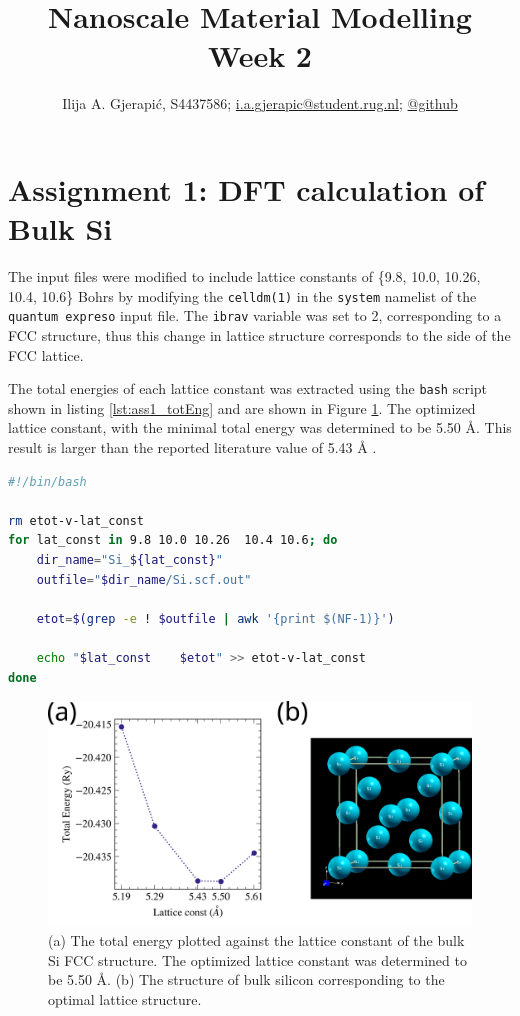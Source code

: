 \documentclass[10pt,a4paper]{labreport}
\title{Nanoscale Material Modelling
\\
\normalsize{Week 2}} %
\author{Ilija A. Gjerapić, S4437586; \href{mailto:i.a.gjerapic@student.rug.nl}{i.a.gjerapic@student.rug.nl}; \href{https://github.com/igjerapic/nmm-week2/}{@github} } %
\begin{document}
\maketitle

\tableofcontents


  

\thispagestyle{firststyle}
\newpage
\section{Assignment 1: DFT calculation of Bulk Si}
The input files were modified to include lattice constants of \{9.8, 10.0, 10.26, 10.4, 10.6\} Bohrs by modifying the  \texttt{celldm(1)} in the \texttt{system} namelist of the \texttt{quantum expreso} input file. The \texttt{ibrav} variable was set to 2, corresponding to a FCC structure, thus this change in lattice structure corresponds to the side of the FCC lattice. 

The total energies of each lattice constant was extracted using the \texttt{bash} script shown in listing \ref{lst:ass1_totEng} and are shown in Figure \ref{fig:ass1}. 
The optimized lattice constant, with the minimal total energy was determined to be 5.50 \AA. 
This result is larger than the reported literature value of 5.43 {\AA} \cite{homAccurateLatticeConstants1975}. 

\begin{lstlisting}[language=bash, 
    caption={The shell script used to extract and store the total energies from the finished simulations of different lattice constants.},
    label=lst:ass1_totEng,
    ]
#!/bin/bash

rm etot-v-lat_const
for lat_const in 9.8 10.0 10.26  10.4 10.6; do
    dir_name="Si_${lat_const}"
    outfile="$dir_name/Si.scf.out"
    
    etot=$(grep -e ! $outfile | awk '{print $(NF-1)}')
    
    echo "$lat_const    $etot" >> etot-v-lat_const
done
\end{lstlisting}

\begin{figure}[h]
    \centering 
    \includegraphics[width = 0.7 \textwidth]{figs/ass1.png}
    \caption{ (a) The total energy plotted against the lattice constant of the bulk Si FCC structure. The optimized lattice constant was determined to be 5.50 \AA. (b) The structure of bulk silicon corresponding to the optimal lattice structure. }
    \label{fig:ass1}
\end{figure}
\end{document}
